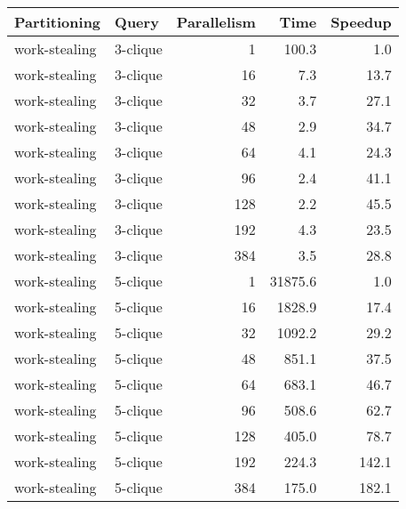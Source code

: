 \begin{tabular}{llr|rr}
\toprule
  Partitioning &     Query &  Parallelism &     Time &  Speedup \\
\midrule
 work-stealing &  3-clique &            1 &    100.3 &      1.0 \\
 work-stealing &  3-clique &           16 &      7.3 &     13.7 \\
 work-stealing &  3-clique &           32 &      3.7 &     27.1 \\
 work-stealing &  3-clique &           48 &      2.9 &     34.7 \\
 work-stealing &  3-clique &           64 &      4.1 &     24.3 \\
 work-stealing &  3-clique &           96 &      2.4 &     41.1 \\
 work-stealing &  3-clique &          128 &      2.2 &     45.5 \\
 work-stealing &  3-clique &          192 &      4.3 &     23.5 \\
 work-stealing &  3-clique &          384 &      3.5 &     28.8 \\
 work-stealing &  5-clique &            1 &  31875.6 &      1.0 \\
 work-stealing &  5-clique &           16 &   1828.9 &     17.4 \\
 work-stealing &  5-clique &           32 &   1092.2 &     29.2 \\
 work-stealing &  5-clique &           48 &    851.1 &     37.5 \\
 work-stealing &  5-clique &           64 &    683.1 &     46.7 \\
 work-stealing &  5-clique &           96 &    508.6 &     62.7 \\
 work-stealing &  5-clique &          128 &    405.0 &     78.7 \\
 work-stealing &  5-clique &          192 &    224.3 &    142.1 \\
 work-stealing &  5-clique &          384 &    175.0 &    182.1 \\
\bottomrule
\end{tabular}
